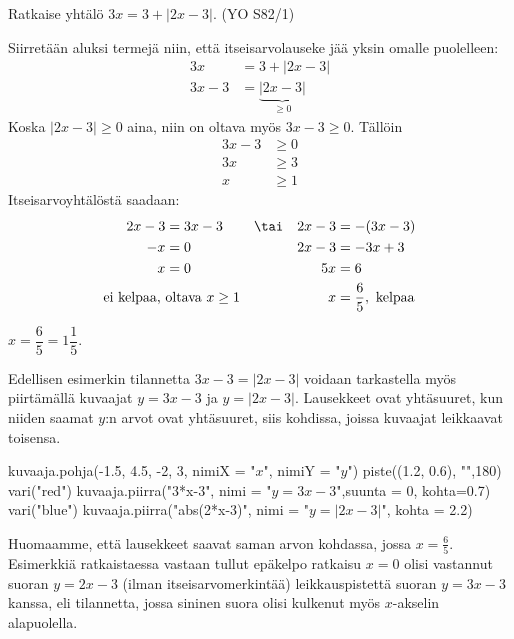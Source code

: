 \begin{esimerkki}
Ratkaise yhtälö $3x=3+|2x-3|$. (YO S82/1)

\begin{esimratk}
Siirretään aluksi termejä niin, että itseisarvolauseke jää yksin omalle puolelleen:
\begin{align*}
3x & =3+|2x-3|  \\
3x-3 & =\underbrace{|2x-3|}_{\geq 0}
\end{align*}
Koska $|2x-3|\geq0$ aina, niin on oltava myös $3x-3\geq0$. Tällöin
\begin{align*}
	3x-3&\geq0 \\
	3x&\geq3 \\
	x&\geq1
\end{align*}
Itseisarvoyhtälöstä saadaan:
\begin{align*}
	2x-3&=3x-3   & &\tai & 2x-3 & =-(3x-3) \\
	-x&=0        && & 2x-3&=-3x+3 \\
	x&=0         && & 5x&=6 \\
	\text{ei kelpaa, } & \text{oltava $x\geq1$}  && & x&=\frac{6}{5}, \text{ kelpaa}
\end{align*}
\end{esimratk}

\begin{esimvast}
$x=\dfrac{6}{5}=1\dfrac{1}{5}$.
\end{esimvast}
\end{esimerkki}

Edellisen esimerkin tilannetta $3x-3=|2x-3|$ voidaan tarkastella myös piirtämällä kuvaajat $y=3x-3$ ja $y=|2x-3|$. Lausekkeet ovat yhtäsuuret, kun niiden saamat $y$:n arvot ovat yhtäsuuret, siis kohdissa, joissa kuvaajat leikkaavat toisensa.

\begin{kuva}
    kuvaaja.pohja(-1.5, 4.5, -2, 3, nimiX = "$x$", nimiY = "$y$")
    piste((1.2, 0.6), "",180)
    vari("red")
    kuvaaja.piirra("3*x-3", nimi = "$y=3x - 3$",suunta = 0, kohta=0.7)
    vari("blue")
    kuvaaja.piirra("abs(2*x-3)", nimi = "$y=|2x - 3|$", kohta = 2.2)
\end{kuva}

Huomaamme, että lausekkeet saavat saman arvon kohdassa, jossa \mbox{$x=\frac{6}{5}$}. Esimerkkiä ratkaistaessa vastaan tullut epäkelpo ratkaisu $x=0$ olisi vastannut suoran $y=2x-3$ (ilman itseisarvomerkintää) leikkauspistettä suoran $y=3x-3$ kanssa, eli tilannetta, jossa sininen suora olisi kulkenut myös $x$-akselin alapuolella.

